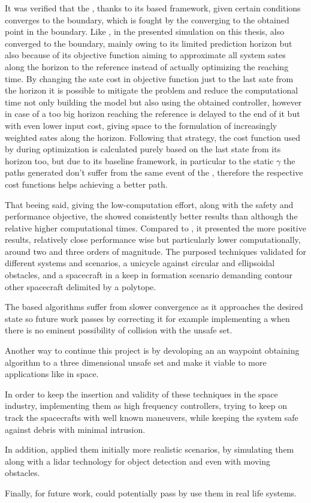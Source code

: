 It was verified that the , thanks to its based framework, given certain conditions converges to the boundary, which is fought by the  converging to the obtained point in the boundary. Like , in the presented simulation on this thesis,  also converged to the boundary, mainly owing to its limited prediction horizon but also because of its objective function aiming to approximate all system sates along the horizon to the reference instead of actually optimizing the reaching time. By changing the sate cost in objective function just to the last sate from the horizon it is possible to mitigate the problem and reduce the computational time not only building the  model but also using the obtained controller, however in case of a too big horizon reaching the reference is delayed to the end of it but with even lower input cost, giving space to the formulation of increasingly weighted sates along the horizon. Following that strategy, the cost function used by  during optimization is calculated purely based on the last state from its horizon too, but due to its baseline framework, in particular to the static \(\gamma\) the paths generated don't suffer from the same event of the , therefore the respective cost functions helps achieving a better path.       

That beeing said, giving the low-computation effort, along with the safety and performance objective, the  showed consistently better results than  although the relative higher computational times. Compared to , it presented the more positive results, relatively close performance wise but particularly lower computationally, around two and three orders of magnitude. The purposed techniques validated for different systems and scenarios, a unicycle against circular and ellipsoidal obstacles, and a spacecraft in a keep in formation scenario demanding contour other spacecraft delimited by a polytope.  

The  based algorithms suffer from slower convergence as it approaches the desired state so future work passes by correcting it for example implementing a  when there is no eminent possibility of collision with the unsafe set. 

Another way to continue this project is by devoloping an an waypoint obtaining algorithm to a three dimensional unsafe set and make it viable to more applications like in space. 

In order to keep the insertion and validity of these techniques in the space industry, implementing them as high frequency controllers, trying to keep on track the spacecrafts with well known maneuvers, while keeping the system safe against debris with minimal intrusion.  

In addition, applied them initially more realistic scenarios, by simulating them along with a lidar technology for object detection and even with moving obstacles.

Finally, for future work, could potentially pass by use them in real life systems. 